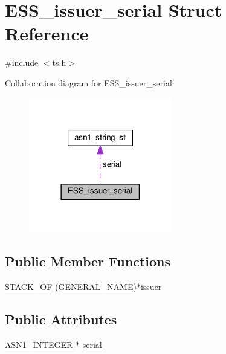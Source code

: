 \hypertarget{struct_e_s_s__issuer__serial}{}\section{E\+S\+S\+\_\+issuer\+\_\+serial Struct Reference}
\label{struct_e_s_s__issuer__serial}


{\ttfamily \#include $<$ts.\+h$>$}



Collaboration diagram for E\+S\+S\+\_\+issuer\+\_\+serial\+:
\nopagebreak
\begin{figure}[H]
\begin{center}
\leavevmode
\includegraphics[width=177pt]{struct_e_s_s__issuer__serial__coll__graph}
\end{center}
\end{figure}
\subsection*{Public Member Functions}
\begin{DoxyCompactItemize}
\item 
\hyperlink{struct_e_s_s__issuer__serial_a760dde58f124b2aff371ebf2e6dc70a9}{S\+T\+A\+C\+K\+\_\+\+OF} (\hyperlink{x509v3_8h_a6688fb8a0c7b8e63f3d47bac3a09eb15}{G\+E\+N\+E\+R\+A\+L\+\_\+\+N\+A\+ME})$\ast$issuer
\end{DoxyCompactItemize}
\subsection*{Public Attributes}
\begin{DoxyCompactItemize}
\item 
\hyperlink{ossl__typ_8h_af4335399bf9774cb410a5e93de65998b}{A\+S\+N1\+\_\+\+I\+N\+T\+E\+G\+ER} $\ast$ \hyperlink{struct_e_s_s__issuer__serial_a7843f6a7d665ee063b624b3d57d16719}{serial}
\end{DoxyCompactItemize}


